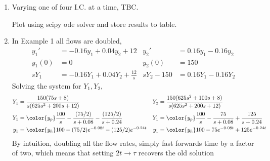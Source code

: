 \begin{enumerate}
    \item Varying one of four I.C. at a time, TBC. \par
          Plot using scipy ode solver and store results to table.

    \item In Example 1 all flows are doubled,
          \begin{align}
              y_1'       & = -0.16y_1 + 0.04y_2 + 12           &
              y_2'       & = 0.16y_1 - 0.16y_2                   \\
              y_1(0)     & = 0                                 &
              y_2(0)     & = 150                                 \\
              sY_1       & = -0.16Y_1 + 0.04Y_2 + \frac{12}{s} &
              sY_2 - 150 & = 0.16Y_1 - 0.16Y_2
          \end{align}
          Solving the system for $ Y_1, Y_2 $,
          \begin{align}
              Y_1        & = \frac{150(75s + 8)}{s(625s^2 + 200s + 12)}               &
              Y_2        & = \frac{150(625s^2 + 100s + 8)}{s(625s^2 + 200s + 12)}       \\
              Y_1        & = \color{y_p} \frac{100}{s} - \frac{(75/2)}{s + 0.08}
              - \frac{(125/2)}
              {s + 0.24} &
              Y_1        & = \color{y_p} \frac{100}{s} - \frac{75}{s + 0.08}
              + \frac{125}
              {s + 0.24}                                                                \\
              y_1        & = \color{y_h} 100 - (75/2) e^{-0.08t} - (125/2) e^{-0.24t} &
              y_1        & = \color{y_h} 100 - 75 e^{-0.08t} + 125 e^{-0.24t}
          \end{align}
          By intuition, doubling all the flow rates, simply fast forwards time by a
          factor of two, which means that setting $ 2t \rightarrow \tau $ recovers the
          old solution


\end{enumerate}
